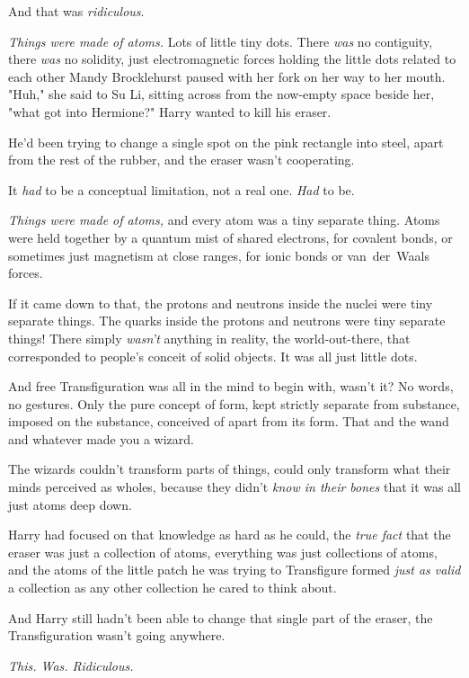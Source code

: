 And that was \emph{ridiculous}.

\emph{Things were made of atoms.} Lots of little tiny dots. There \emph{was} no
contiguity, there \emph{was} no solidity, just electromagnetic forces holding
the little dots related to each other{\el}
\sbreak
Mandy Brocklehurst paused with her fork on her way to her mouth. "Huh," she
said to Su Li, sitting across from the now-empty space beside her, "what got
into Hermione?"
\sbreak
Harry wanted to kill his eraser.

He'd been trying to change a single spot on the pink rectangle into steel,
apart from the rest of the rubber, and the eraser wasn't cooperating.

It \emph{had} to be a conceptual limitation, not a real one. \emph{Had} to be.

\emph{Things were made of atoms,} and every atom was a tiny separate thing.
Atoms were held together by a quantum mist of shared electrons, for covalent
bonds, or sometimes just magnetism at close ranges, for ionic bonds or
van~der~Waals forces.

If it came down to that, the protons and neutrons inside the nuclei were tiny
separate things. The quarks inside the protons and neutrons were tiny separate
things! There simply \emph{wasn't} anything in reality, the world-out-there,
that corresponded to people's conceit of solid objects. It was all just little
dots.

And free Transfiguration was all in the mind to begin with, wasn't it? No
words, no gestures. Only the pure concept of form, kept strictly separate from
substance, imposed on the substance, conceived of apart from its form. That and
the wand and whatever made you a wizard.

The wizards couldn't transform parts of things, could only transform what their
minds perceived as wholes, because they didn't \emph{know in their bones} that
it was all just atoms deep down.

Harry had focused on that knowledge as hard as he could, the \emph{true fact}
that the eraser was just a collection of atoms, everything was just collections
of atoms, and the atoms of the little patch he was trying to Transfigure formed
\emph{just as valid} a collection as any other collection he cared to think
about.

And Harry still hadn't been able to change that single part of the eraser, the
Transfiguration wasn't going anywhere.

\emph{This. Was. Ridiculous.}

